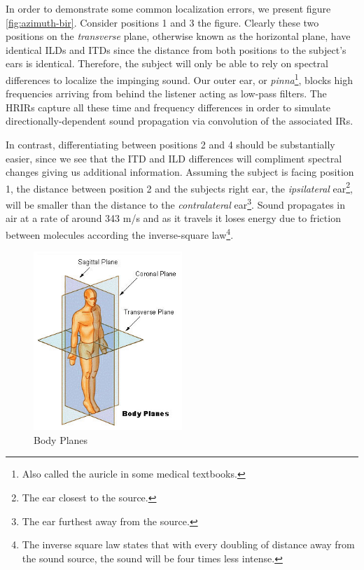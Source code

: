 In order to demonstrate some common localization errors, we present figure \ref{fig:azimuth-bir}. Consider positions 1 and 3 the figure. Clearly these two positions on the \textit{transverse} plane, otherwise known as the horizontal plane, have identical ILDs and ITDs since the distance from both positions to the subject's ears is identical. Therefore, the subject will only be able to rely on spectral differences to localize the impinging sound. Our outer ear, or \textit{pinna}\footnote{Also called the auricle in some medical textbooks.}, blocks high frequencies arriving from behind the listener acting as low-pass filters. The HRIRs capture all these time and frequency differences in order to simulate directionally-dependent sound propagation via convolution of the associated IRs. 

In contrast, differentiating between positions 2 and 4 should be substantially easier, since we see that the ITD and ILD differences will compliment spectral changes giving us additional information. Assuming the subject is facing position 1, the distance between position 2 and the subjects right ear, the \textit{ipsilateral} ear\footnote{The ear closest to the source.}, will be smaller than the distance to the \textit{contralateral} ear\footnote{The ear furthest away from the source.}. Sound propagates in air at a rate of around 343 m/s and as it travels it loses energy due to friction between molecules according the inverse-square law\footnote{The inverse square law states that with every doubling of distance away from the sound source, the sound will be four times less intense.}. 

\begin{figure}[ht!]%
\centering
\includegraphics[width=0.5\textwidth]{img/body-planes.jpg}
\caption{Body Planes \cite{body_planes_pic}}
\label{fig:body-planes}
\end{figure}

